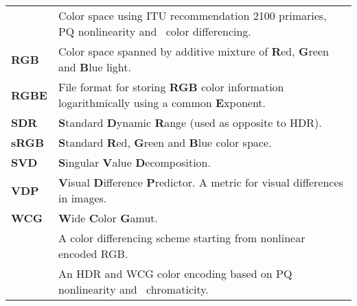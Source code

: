 \begin{flushleft}
\begin{longtable}[c]{@{}p{28.5mm}@{} p{120.5mm}}
	\textbf{\RecTTPQ}& Color space using ITU recommendation 2100 primaries, PQ nonlinearity and \YCbCr\ color differencing.\\
	\textbf{RGB}	& Color space spanned by additive mixture of \textbf{R}ed, \textbf{G}reen and \textbf{B}lue light.\\
	\textbf{RGBE}	& File format for storing \textbf{RGB} color information logarithmically using a common \textbf{E}xponent.\\
	\textbf{SDR}	& \textbf{S}tandard \textbf{D}ynamic \textbf{R}ange (used as opposite to HDR).\\ 
	\textbf{sRGB}	& \textbf{S}tandard \textbf{R}ed, \textbf{G}reen and \textbf{B}lue color space.\\
	\textbf{SVD}	& \textbf{S}ingular \textbf{V}alue \textbf{D}ecomposition.\\
	\textbf{VDP}	& \textbf{V}isual \textbf{D}ifference \textbf{P}redictor. A metric for visual differences in images.\\
	\textbf{WCG}	& \textbf{W}ide \textbf{C}olor \textbf{G}amut.\\
	\textbf{\YCbCr} & A color differencing scheme starting from nonlinear encoded RGB.\\
	\textbf{\YuvDP} & An HDR and WCG color encoding based on PQ nonlinearity and \uv\ chromaticity.\\
\end{longtable}
\end{flushleft}
%
%